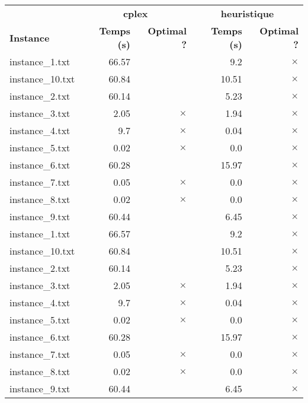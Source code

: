 \documentclass{article}
\begin{document}
\begin{center}
\renewcommand{\arraystretch}{1.4} 
 \begin{tabular}{lrrrr}
	\hline
 & \multicolumn{2}{c}{\textbf{cplex}} & \multicolumn{2}{c}{\textbf{heuristique}}\\
\textbf{Instance}  & \textbf{Temps (s)} & \textbf{Optimal ?}  & \textbf{Temps (s)} & \textbf{Optimal ?} \\\hline

instance\_1.txt & 66.57 & 
 & 9.2 & 
$\times$
\\
instance\_10.txt & 60.84 & 
 & 10.51 & 
$\times$
\\
instance\_2.txt & 60.14 & 
 & 5.23 & 
$\times$
\\
instance\_3.txt & 2.05 & 
$\times$
 & 1.94 & 
$\times$
\\
instance\_4.txt & 9.7 & 
$\times$
 & 0.04 & 
$\times$
\\
instance\_5.txt & 0.02 & 
$\times$
 & 0.0 & 
$\times$
\\
instance\_6.txt & 60.28 & 
 & 15.97 & 
$\times$
\\
instance\_7.txt & 0.05 & 
$\times$
 & 0.0 & 
$\times$
\\
instance\_8.txt & 0.02 & 
$\times$
 & 0.0 & 
$\times$
\\
instance\_9.txt & 60.44 & 
 & 6.45 & 
$\times$
\\
instance\_1.txt & 66.57 & 
 & 9.2 & 
$\times$
\\
instance\_10.txt & 60.84 & 
 & 10.51 & 
$\times$
\\
instance\_2.txt & 60.14 & 
 & 5.23 & 
$\times$
\\
instance\_3.txt & 2.05 & 
$\times$
 & 1.94 & 
$\times$
\\
instance\_4.txt & 9.7 & 
$\times$
 & 0.04 & 
$\times$
\\
instance\_5.txt & 0.02 & 
$\times$
 & 0.0 & 
$\times$
\\
instance\_6.txt & 60.28 & 
 & 15.97 & 
$\times$
\\
instance\_7.txt & 0.05 & 
$\times$
 & 0.0 & 
$\times$
\\
instance\_8.txt & 0.02 & 
$\times$
 & 0.0 & 
$\times$
\\
instance\_9.txt & 60.44 & 
 & 6.45 & 
$\times$
\\
\hline\end{tabular}
\end{center}
\end{document}
